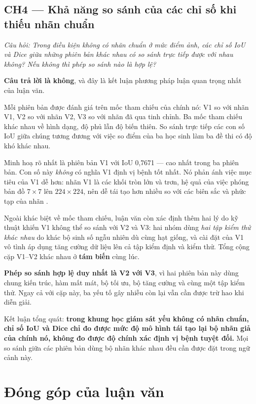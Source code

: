 \subsection{CH4 --- Khả năng so sánh của các chỉ số khi thiếu nhãn chuẩn}

\emph{Câu hỏi: Trong điều kiện không có nhãn chuẩn ở mức điểm ảnh, các chỉ số IoU
và Dice giữa những phiên bản khác nhau có so sánh trực tiếp được với nhau không?
Nếu không thì phép so sánh nào là hợp lệ?}

\textbf{Câu trả lời là không}, và đây là kết luận phương pháp luận quan trọng nhất
của luận văn.

Mỗi phiên bản được đánh giá trên mốc tham chiếu của chính nó: V1 so với nhãn V1,
V2 so với nhãn V2, V3 so với nhãn đã qua tinh chỉnh. Ba mốc tham chiếu khác nhau về
hình dạng, độ phủ lẫn độ biến thiên. So sánh trực tiếp các con số IoU giữa chúng
tương đương với việc so điểm của ba học sinh làm ba đề thi có độ khó khác nhau.

Minh hoạ rõ nhất là phiên bản V1 với IoU 0,7671 --- cao nhất trong ba phiên bản.
Con số này \emph{không} có nghĩa V1 định vị bệnh tốt nhất. Nó phản ánh việc mục
tiêu của V1 dễ hơn: nhãn V1 là các khối tròn lớn và trơn, hệ quả của việc phóng
bản đồ $7 \times 7$ lên $224 \times 224$, nên dễ tái tạo hơn nhiều so với các biên
sắc và phức tạp của nhãn \SAM{}.

Ngoài khác biệt về mốc tham chiếu, luận văn còn xác định thêm hai lý do kỹ thuật
khiến V1 không thể so sánh với V2 và V3: hai nhóm dùng \emph{hai tập kiểm thử khác
nhau} do khác bộ sinh số ngẫu nhiên dù cùng hạt giống, và cài đặt của V1 vô tình
áp dụng tăng cường dữ liệu lên cả tập kiểm định và kiểm thử. Tổng cộng cặp V1--V2
khác nhau ở \textbf{tám biến} cùng lúc.

\textbf{Phép so sánh hợp lệ duy nhất là V2 với V3}, vì hai phiên bản này dùng chung
kiến trúc, hàm mất mát, bộ tối ưu, bộ tăng cường và cùng một tập kiểm thử. Ngay cả
với cặp này, ba yếu tố gây nhiễu còn lại vẫn cần được trừ hao khi diễn giải.

Kết luận tổng quát: \textbf{trong khung học giám sát yếu không có nhãn chuẩn, chỉ
số IoU và Dice chỉ đo được mức độ mô hình tái tạo lại bộ nhãn giả của chính nó,
không đo được độ chính xác định vị bệnh tuyệt đối.} Mọi so sánh giữa các phiên bản
dùng bộ nhãn khác nhau đều cần được đặt trong ngữ cảnh này.

\section{Đóng góp của luận văn}

